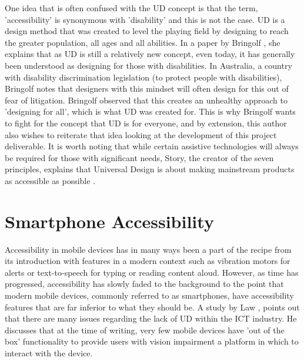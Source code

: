 One idea that is often confused with the UD concept is that the term, 'accessibility' is synonymous with 'disability' and this is not the case.
UD is a design method that was created to level the playing field by designing to reach the greater population, all ages and all abilities.
In a paper by Bringolf \cite{accessible}, she explains that as UD is still a relatively new concept, even today, it has generally been understood as designing for those with disabilities.
In Australia, a country with disability discrimination legislation (to protect people with disabilities), Bringolf notes that designers with this mindset will often design for this out of fear of litigation.
Bringolf observed that this creates an unhealthy approach to 'designing for all', which is what UD was created for. %
This is why Bringolf wants to fight for the concept that UD is for everyone, and by extension, this author also wishes to reiterate that idea looking at the development of this project deliverable. %
It is worth noting that while certain assistive technologies will always be required for those with significant needs, Story, the creator of the seven principles, explains that Universal Design is about making mainstream products as accessible as possible \cite{sevenprinciples}.


\section{Smartphone Accessibility}
Accessibility in mobile devices has in many ways been a part of the recipe from its introduction with features in a modern context such as vibration motors for alerts or text-to-speech for typing or reading content aloud.
However, as time has progressed, accessibility has slowly faded to the background to the point that modern mobile devices, commonly referred to as smartphones, have accessibility features that are far inferior to what they should be. %
A study by Law \cite{cellphone}, points out that there are many issues regarding the lack of UD within the ICT industry. %
He discusses that at the time of writing, very few mobile devices have 'out of the box' functionality to provide users with vision impairment a platform in which to interact with the device. %

